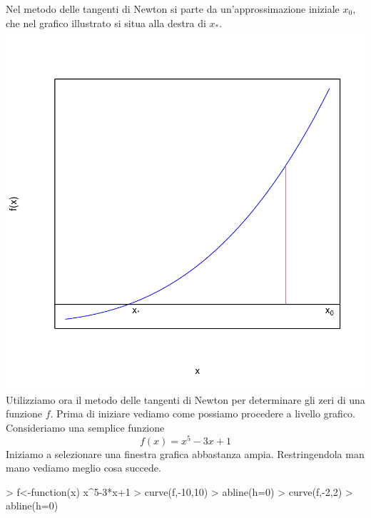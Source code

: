 \documentclass[onecolumn,11pt]{book}
\begin{document}
Nel metodo delle tangenti di Newton si parte da un'approssimazione iniziale $x_0$, che nel grafico illustrato si situa alla destra di $x_*$.
\includegraphics{Rmatematica-130}
Utilizziamo ora il metodo delle tangenti di Newton per determinare gli zeri di una funzione $f$. Prima di iniziare vediamo come possiamo procedere a livello grafico. 
Consideriamo una semplice funzione  $$ f(x)= x^5-3x+1$$
Iniziamo a selezionare una finestra grafica abbastanza ampia. Restringendola man mano vediamo meglio cosa succede.
\begin{Schunk}
\begin{Sinput}
> f<-function(x) x^5-3*x+1
> curve(f,-10,10) 
> abline(h=0)
> curve(f,-2,2)
> abline(h=0)
\end{Sinput}
\end{Schunk}
\end{document}
